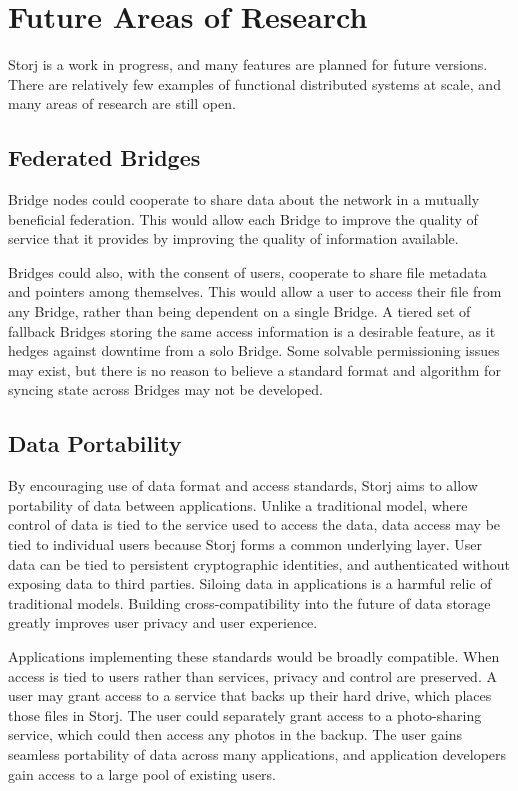 \documentclass[a4paper,10pt]{article}
\begin{document}
\section{Future Areas of Research}
Storj is a work in progress, and many features are planned for future versions. There are relatively few examples of functional distributed systems at scale, and many areas of research are still open.

\subsection{Federated Bridges}
Bridge nodes could cooperate to share data about the network in a mutually beneficial federation. This would allow each Bridge to improve the quality of service that it provides by improving the quality of information available.

Bridges could also, with the consent of users, cooperate to share file metadata and pointers among themselves. This would allow a user to access their file from any Bridge, rather than being dependent on a single Bridge. A tiered set of fallback Bridges storing the same access information is a desirable feature, as it hedges against downtime from a solo Bridge. Some solvable permissioning issues may exist, but there is no reason to believe a standard format and algorithm for syncing state across Bridges may not be developed.

\subsection{Data Portability}
By encouraging use of data format and access standards, Storj aims to allow portability of data between applications. Unlike a traditional model, where control of data is tied to the service used to access the data, data access may be tied to individual users because Storj forms a common underlying layer. User data can be tied to persistent cryptographic identities, and authenticated without exposing data to third parties. Siloing data in applications is a harmful relic of traditional models. Building cross-compatibility into the future of data storage greatly improves user privacy and user experience.

Applications implementing these standards would be broadly compatible. When access is tied to users rather than services, privacy and control are preserved. A user may grant access to a service that backs up their hard drive, which places those files in Storj. The user could separately grant access to a photo-sharing service, which could then access any photos in the backup. The user gains seamless portability of data across many applications, and application developers gain access to a large pool of existing users.
\end{document}
